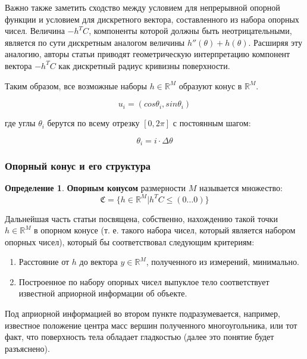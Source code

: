 \documentclass[a4paper, 12pt, titlepage]{article}
\theoremstyle{definition}
\newtheorem{SmartDefinition}{Определение}
\theoremstyle{plain}
\theoremstyle{plain}
\begin{document}
Важно также заметить сходство между условием для непрерывной опорной функции и
условием для дискретного вектора, составленного из набора опорных чисел.
Величина $ - h^{T} C$, компоненты которой должны быть неотрицательными, является
по сути дискретным аналогом величины $h''(\theta) + h(\theta)$. Расширяя эту
аналогию, авторы статьи приводят геометрическую интерпретацию компонент вектора
$ - h^{T} C$ как дискретный радиус кривизны поверхности.

Таким образом, все возможные наборы $h \in \mathbb{R}^{M}$ образуют конус в
$\mathbb{R}^{M}$.

\begin{equation}
 u_{i} = (cos \theta_{i}, sin \theta_{i})
\end{equation}

где углы $\theta_{i}$ берутся по всему отрезку $[0, 2 \pi]$ с постоянным шагом:

\begin{equation}
 \theta_{i} = i \cdot \Delta \theta
\end{equation}

\subsubsection{Опорный конус и его структура}
\label{sec:history/PrinceW90/support-cone}

\begin{SmartDefinition}
 \label{def:support-cone}
 \textbf{Опорным конусом} размерности $M$ называется множество:
 \begin{equation}
 \mathfrak{C} = \{h \in \mathbb{R}^{M} | h^{T} C \leq (0 \ldots 0) \}
 \end{equation}
\end{SmartDefinition}

Дальнейшая часть статьи посвящена, собственно, нахождению такой точки
$h \in \mathbb{R}^{M}$ в
опорном конусе (т. е. такого набора чисел, который является набором опорных
чисел), который бы соответствовал следующим критериям:

\begin{enumerate}
 \item Расстояние от $h$ до вектора $y \in \mathbb{R}^{M}$, полученного из
измерений, минимально.
 \item Построенное по набору опорных чисел выпуклое тело соответствует
известной априорной информации об объекте.
\end{enumerate}

Под априорной информацией во втором пункте подразумевается, например, известное
положение центра масс вершин полученного многоугольника, или тот факт, что
поверхность тела обладает гладкостью (далее это понятие будет разъяснено).
\end{document}
